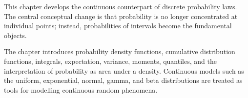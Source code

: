 This chapter develops the continuous counterpart of discrete probability laws. The central conceptual change is that probability is no longer concentrated at individual points; instead, probabilities of intervals become the fundamental objects.

The chapter introduces probability density functions, cumulative distribution functions, integrals, expectation, variance, moments, quantiles, and the interpretation of probability as area under a density. Continuous models such as the uniform, exponential, normal, gamma, and beta distributions are treated as tools for modelling continuous random phenomena.










